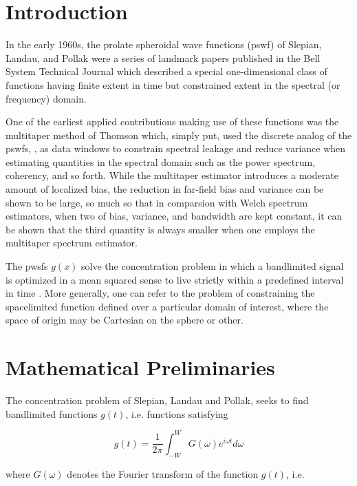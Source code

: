 \documentclass[preprint,12pt]{elsarticle}
\begin{document}


\section{Introduction}
In the early 1960s, the prolate spheroidal wave functions (pswf) of Slepian, Landau, and Pollak \cite{pswf1,pswf2,pswf3,pswf4} were a series of landmark papers published
in the Bell System Technical Journal which described a special one-dimensional class of functions 
having finite extent in time but constrained extent in the spectral (or frequency) domain. 

One of the earliest applied contributions making use of these functions was the multitaper method of Thomson \cite{T82, pw93} which, 
simply put, used the discrete analog of the pswfs, \cite{S78}, as data windows to constrain spectral leakage and reduce variance when estimating quantities in the spectral domain such as the power spectrum, coherency, and so forth. While the multitaper estimator introduces a moderate amount of localized bias, the reduction in far-field bias and variance can be shown to be large, so much so that in comparsion with Welch spectrum estimators, when two of bias, variance, and bandwidth are kept constant, it can be shown \cite{bronez92} that the third quantity is always smaller when one employs the multitaper spectrum estimator. 

The pwsfs $g(x)$ solve the concentration problem in which a bandlimited signal is optimized in a mean squared sense to live strictly within a predefined interval in time \cite{slepian83}. More generally, one can refer to the problem of constraining the spacelimited function defined over a particular domain of interest, where the space of origin may be Cartesian \cite{simons2011} on the sphere \cite{simons2006} or other. 

\section{Mathematical Preliminaries}

The concentration problem of Slepian, Landau and Pollak, seeks to find bandlimited functions
$g(t)$, i.e. functions satisfying 

\begin{equation} g(t) = \frac{1}{2 \pi} \int_{-W}^{W} G(\omega) e^{i\omega t} d\omega \end{equation}

where $G(\omega)$ denotes the Fourier transform of the function $g(t)$, i.e.
\end{document}
